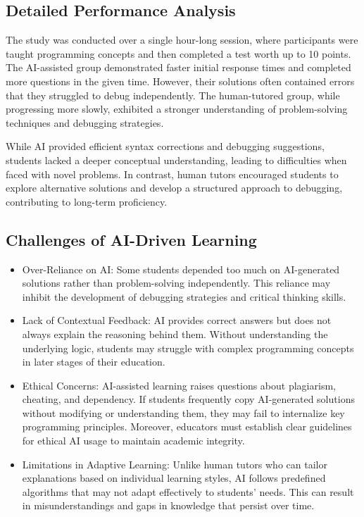 \documentclass[12pt]{article}  %
\begin{document}
\subsection{Detailed Performance Analysis}
The study was conducted over a single hour-long session, where participants were taught programming concepts and then completed a test worth up to 10 points. The AI-assisted group demonstrated faster initial response times and completed more questions in the given time. However, their solutions often contained errors that they struggled to debug independently. The human-tutored group, while progressing more slowly, exhibited a stronger understanding of problem-solving techniques and debugging strategies.

While AI provided efficient syntax corrections and debugging suggestions, students lacked a deeper conceptual understanding, leading to difficulties when faced with novel problems. In contrast, human tutors encouraged students to explore alternative solutions and develop a structured approach to debugging, contributing to long-term proficiency.

\subsection{Challenges of AI-Driven Learning}
\begin{itemize}
\item Over-Reliance on AI: Some students depended too much on AI-generated solutions rather than problem-solving independently. This reliance may inhibit the development of debugging strategies and critical thinking skills.
\item Lack of Contextual Feedback: AI provides correct answers but does not always explain the reasoning behind them. Without understanding the underlying logic, students may struggle with complex programming concepts in later stages of their education.
\item Ethical Concerns: AI-assisted learning raises questions about plagiarism, cheating, and dependency. If students frequently copy AI-generated solutions without modifying or understanding them, they may fail to internalize key programming principles. Moreover, educators must establish clear guidelines for ethical AI usage to maintain academic integrity.
\item Limitations in Adaptive Learning: Unlike human tutors who can tailor explanations based on individual learning styles, AI follows predefined algorithms that may not adapt effectively to students' needs. This can result in misunderstandings and gaps in knowledge that persist over time.
\end{itemize}
\end{document}
